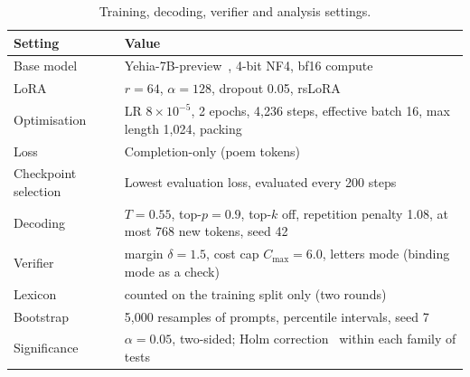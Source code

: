 \begin{table}[t]
\centering
\caption{Training, decoding, verifier and analysis settings.}
\label{tab:settings}
\footnotesize
\begin{tabularx}{\columnwidth}{@{}>{\raggedright\arraybackslash}p{2.7cm} X@{}}
\toprule
Setting & Value \\
\midrule
Base model & Yehia-7B-preview~\cite{yehia2025}, 4-bit NF4, bf16 compute \\
LoRA & $r=64$, $\alpha=128$, dropout 0.05, rsLoRA \\
Optimisation & LR $8\times10^{-5}$, 2 epochs, 4,236 steps, effective batch 16, max length 1,024, packing \\
Loss & Completion-only (poem tokens) \\
Checkpoint selection & Lowest evaluation loss, evaluated every 200 steps \\
Decoding & $T=0.55$, top-$p=0.9$, top-$k$ off, repetition penalty 1.08, at most 768 new tokens, seed 42 \\
\midrule
Verifier & margin $\delta=1.5$, cost cap $C_{\max}=6.0$, letters mode (binding mode as a check) \\
Lexicon & counted on the training split only (two rounds) \\
\midrule
Bootstrap & 5,000 resamples of prompts, percentile intervals, seed 7 \\
Significance & $\alpha = 0.05$, two-sided; Holm correction~\cite{holm1979simple} within each family of tests \\
\bottomrule
\end{tabularx}
\end{table}

